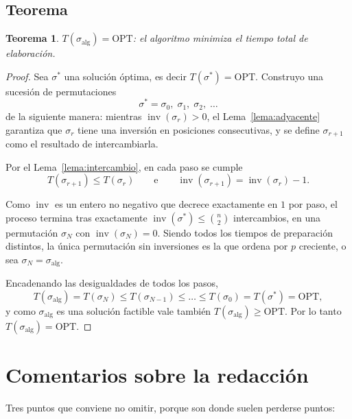 \documentclass[11pt,a4paper]{article}
\theoremstyle{plain}
\newtheorem{teorema}{Teorema}
\theoremstyle{definition}
\theoremstyle{remark}
\newcommand{\inv}{\operatorname{inv}}
\begin{document}
\subsection*{Teorema}

\begin{teorema}
$T(\sigma_{\mathrm{alg}}) = \mathrm{OPT}$: el algoritmo minimiza el tiempo total
de elaboración.
\end{teorema}

\begin{proof}
Sea $\sigma^{*}$ una solución óptima, es decir
$T(\sigma^{*}) = \mathrm{OPT}$. Construyo una sucesión de permutaciones
\[
  \sigma^{*} = \sigma_0,\; \sigma_1,\; \sigma_2,\; \dots
\]
de la siguiente manera: mientras $\inv(\sigma_r) > 0$, el
Lema~\ref{lema:adyacente} garantiza que $\sigma_r$ tiene una inversión en
posiciones consecutivas, y se define $\sigma_{r+1}$ como el resultado de
intercambiarla.

Por el Lema~\ref{lema:intercambio}, en cada paso se cumple
\[
  T(\sigma_{r+1}) \leq T(\sigma_r)
  \qquad\text{e}\qquad
  \inv(\sigma_{r+1}) = \inv(\sigma_r) - 1 .
\]

Como $\inv$ es un entero no negativo que decrece exactamente en $1$ por paso, el
proceso termina tras exactamente $\inv(\sigma^{*}) \leq \binom{n}{2}$
intercambios, en una permutación $\sigma_N$ con $\inv(\sigma_N) = 0$. Siendo
todos los tiempos de preparación distintos, la única permutación sin inversiones
es la que ordena por $p$ creciente, o sea
$\sigma_N = \sigma_{\mathrm{alg}}$.

Encadenando las desigualdades de todos los pasos,
\[
  T(\sigma_{\mathrm{alg}}) = T(\sigma_N) \leq T(\sigma_{N-1}) \leq \dots
  \leq T(\sigma_0) = T(\sigma^{*}) = \mathrm{OPT},
\]
y como $\sigma_{\mathrm{alg}}$ es una solución factible vale también
$T(\sigma_{\mathrm{alg}}) \geq \mathrm{OPT}$. Por lo tanto
$T(\sigma_{\mathrm{alg}}) = \mathrm{OPT}$.
\end{proof}

\section*{Comentarios sobre la redacción}

Tres puntos que conviene no omitir, porque son donde suelen perderse puntos:
\end{document}
